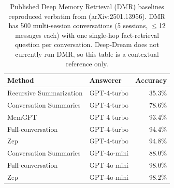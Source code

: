 \begin{table}[t]
\centering
\caption{Published Deep Memory Retrieval (DMR) baselines reproduced verbatim from \citet{rasmussen2025zep} (arXiv:2501.13956). DMR has 500 multi-session conversations (5 sessions, $\leq$12 messages each) with one single-hop fact-retrieval question per conversation. Deep-Dream does not currently run DMR, so this table is a contextual reference only.}
\label{tab:zep-dmr}
\small
\begin{tabular}{llr}
\toprule
Method & Answerer & Accuracy \\
\midrule
Recursive Summarization & GPT-4-turbo & 35.3\% \\
Conversation Summaries & GPT-4-turbo & 78.6\% \\
MemGPT & GPT-4-turbo & 93.4\% \\
Full-conversation & GPT-4-turbo & 94.4\% \\
Zep & GPT-4-turbo & 94.8\% \\
Conversation Summaries & GPT-4o-mini & 88.0\% \\
Full-conversation & GPT-4o-mini & 98.0\% \\
Zep & GPT-4o-mini & 98.2\% \\
\bottomrule
\end{tabular}
\end{table}
